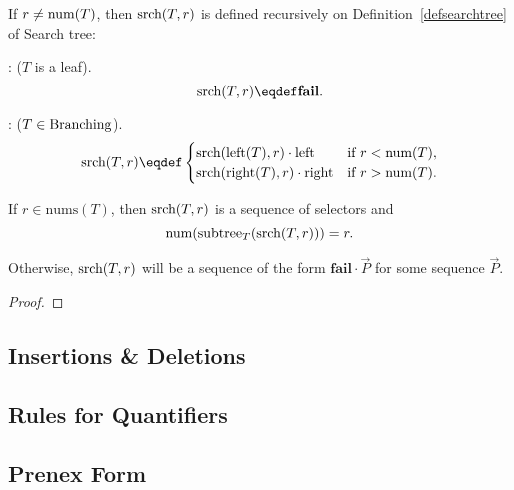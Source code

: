 \begin{definition}
\begin{definition}
If $r \neq \text{num}(T)$, then $\text{srch}(T,r)$ is defined recursively
on Definition~\ref{defsearchtree} of Search tree:

: ($T$ is a leaf).
\[
\trsrch{(T,r)} \eqdef \textbf{fail}.
\]

: ($T \in \text{Branching}$).
\[
\trsrch{(T,r)} \eqdef
 \begin{cases} 
\trsrch{(\leftsub{(T)},r)} \cdot \leftsub{} & \text{if $r < \nlbl{(T)$}},\\
\trsrch{(\rightsub{(T)},r)}\cdot \rightsub{}& \text{if $r > \nlbl{(T)}$}.
\end{cases}
\]
\end{definition}

\begin{theorem}
If $r \in \text{nums}(T)$, then $\text{srch}(T,r)$ is a sequence of
selectors and
\[
\text{num}(\text{subtree}_{T}(\text{srch}(T,r))) = r.
\]

Otherwise, $\text{srch}(T,r)$ will be a sequence of the form
$\textbf{fail}\cdot \vec{P}$ for some sequence $\vec{P}$.
\end{theorem}

\begin{proof}


\end{proof}

\subsection{Insertions \& Deletions}


\begin{editingnotes}
\section{Rules for Quantifiers}

\subsection{Prenex Form}
\begin{problems}
\end{problems}
\end{editingnotes}


\end{definition}
